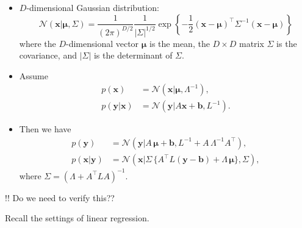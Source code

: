 \documentclass[
]{article}
\begin{document}
\begin{itemize}
\item
  \(D\)-dimensional Gaussian distribution:
  \[ \mathcal N({\boldsymbol{x}}|\pmb \mu,  \Sigma) = \frac 1 {(2\pi)^{D/2}}\frac 1 {| \Sigma|^{1/2}} \exp \left \{ -\frac 1 2 ({\boldsymbol{x}}-\pmb \mu)^\top  \Sigma^{-1} ({\boldsymbol{x}}-\pmb\mu) \right \} \]
  where the \(D\)-dimensional vector \(\pmb \mu\) is the mean, the
  \(D\times D\) matrix \(\Sigma\) is the covariance, and \(|\Sigma|\) is
  the determinant of \(\Sigma\).
\item
  Assume \begin{align*}
  p({\boldsymbol{x}}) & = \mathcal N ({\boldsymbol{x}}| \pmb \mu, \Lambda^{-1}), \\
  p({\boldsymbol{y}}|{\boldsymbol{x}}) & = \mathcal N ({\boldsymbol{y}}| A{\boldsymbol{x}}+ \pmb b, L^{-1}) .
  \end{align*}
\item
  Then we have \begin{align*}
  p({\boldsymbol{y}}) & = \mathcal N ({\boldsymbol{y}}| A \, \pmb \mu+\pmb b,  L^{-1}+ A \,  \Lambda^{-1} A^\top), \\
  p({\boldsymbol{x}}|{\boldsymbol{y}}) & = \mathcal N( {\boldsymbol{x}}|  \Sigma \, \{ A^\top  L({\boldsymbol{y}}-\pmb b) +  \Lambda \, \pmb \mu \},  \Sigma),
  \end{align*} where \(\Sigma=(\Lambda+A^\top L A)^{-1}\).
\end{itemize}

!! Do we need to verify this??

Recall the settings of linear regression.
\end{document}
